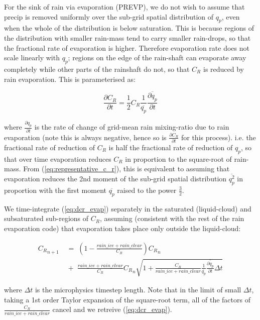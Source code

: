 \documentclass{UMDP_article}
\begin{document}
For the sink of rain via evaporation (PREVP), we do not wish to assume that
precip is removed uniformly over the sub-grid spatial distribution of $q_p$,
even when the whole of the distribution is below saturation.
This is because regions of the distribution with smaller rain-mass
tend to carry smaller rain-drops, so that the fractional rate of evaporation
is higher.  Therefore evaporation rate does not scale linearly with $q_p$;
regions on the edge of the rain-shaft can evaporate away completely
while other parts of the rainshaft do not,
so that $C_R$ is reduced by rain evaporation.
This is parameterised as:

\begin{equation} \label{eq:dcr_evap}
\frac{\partial C_R}{\partial t} = \frac{1}{2} C_R
  \frac{1}{\overline{q_p}} \overline{ \frac{\partial q_p}{\partial t} }
\end{equation}

where $\frac{\partial q_p}{\partial t}$ is the rate of change of
grid-mean rain mixing-ratio due to rain evaporation
(note this is always negative, hence so is
$\tfrac{\partial C_R}{\partial t}$ for this process).
i.e. the fractional rate of reduction of $C_R$ is half the fractional rate
of reduction of $q_p$, so that over time evaporation reduces $C_R$
in proportion to the square-root of rain-mass.
From (\ref{eq:representative_c_r}), this is equivalent to assuming that
evaporation reduces the 2nd moment of the sub-grid spatial distribution
$\overline{q_p^2}$ in proportion with the first moment $\overline{q_p}$
raised to the power $\tfrac{3}{2}$.

We time-integrate (\ref{eq:dcr_evap}) separately in the saturated
(liquid-cloud) and subsaturated sub-regions of $C_R$, assuming
(consistent with the rest of the rain evaporation code)
that evaporation takes place only outside the liquid-cloud:

\begin{align}
{C_R}_{n+1}
& \; = \; \left( 1 - \frac{rain\_ice + rain\_clear}{C_R} \right) {C_R}_n
\nonumber \\
& \; + \; \frac{rain\_ice + rain\_clear}{C_R} {C_R}_n
             \sqrt{ 1 + \frac{C_R}{rain\_ice + rain\_clear}
                        \frac{1}{\overline{q_p}}
                        \overline{\frac{\partial q_p}{\partial t}} \Delta t }
\nonumber
\end{align}

where $\Delta t$ is the microphysics timestep length.
Note that in the limit of small $\Delta t$, taking a 1st order Taylor expansion
of the square-root term, all of the factors of
$\frac{C_R}{rain\_ice + rain\_clear}$ cancel and we retreive
(\ref{eq:dcr_evap}).
\end{document}
